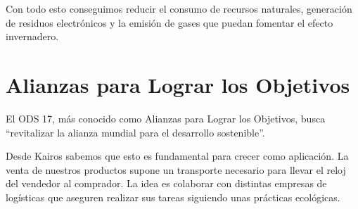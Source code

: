 	Con todo esto conseguimos reducir el consumo de recursos naturales, generación de residuos electrónicos y la emisión de gases que puedan fomentar el efecto invernadero.
	

\section{Alianzas para Lograr los Objetivos}

	El ODS 17, más conocido como Alianzas para Lograr los Objetivos, busca ``revitalizar la alianza mundial para el desarrollo sostenible''.
	
	Desde Kairos sabemos que esto es fundamental para crecer como aplicación. La venta de nuestros productos supone un transporte necesario para llevar el reloj del vendedor al comprador. La idea es colaborar con distintas empresas de logísticas que aseguren realizar sus tareas siguiendo unas prácticas ecológicas.

